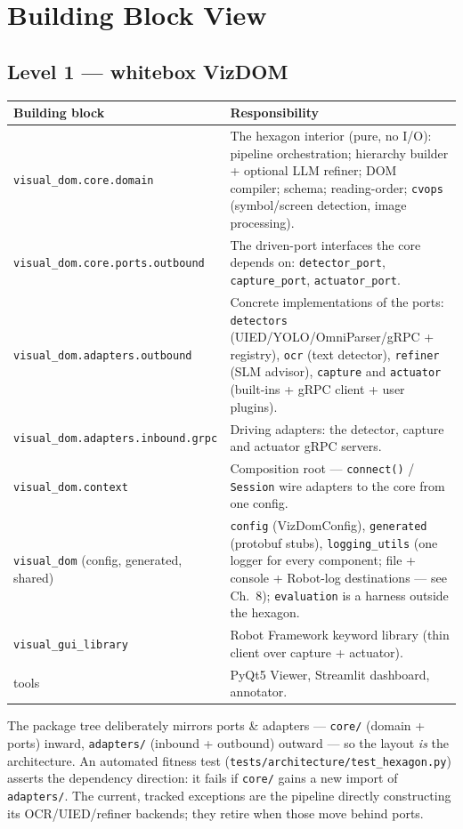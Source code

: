 \documentclass[11pt,a4paper]{report}
\newcommand{\code}[1]{\texttt{#1}}
\begin{document}
\chapter{Building Block View}
\section{Level 1 --- whitebox VizDOM}
\begin{longtable}{@{}p{3.8cm}p{10.8cm}@{}}
\toprule
\textbf{Building block} & \textbf{Responsibility} \\
\midrule
\endhead
\code{visual\_dom.core.domain} & The hexagon interior (pure, no I/O): pipeline orchestration; hierarchy builder + optional LLM refiner; DOM compiler; schema; reading-order; \code{cvops} (symbol/screen detection, image processing). \\
\code{visual\_dom.core.ports.\allowbreak outbound} & The driven-port interfaces the core depends on: \code{detector\_port}, \code{capture\_port}, \code{actuator\_port}. \\
\code{visual\_dom.adapters.\allowbreak outbound} & Concrete implementations of the ports: \code{detectors} (UIED/YOLO/OmniParser/gRPC + registry), \code{ocr} (text detector), \code{refiner} (SLM advisor), \code{capture} and \code{actuator} (built-ins + gRPC client + user plugins). \\
\code{visual\_dom.adapters.\allowbreak inbound.grpc} & Driving adapters: the detector, capture and actuator gRPC servers. \\
\code{visual\_dom.context} & Composition root --- \code{connect()} / \code{Session} wire adapters to the core from one config. \\
\code{visual\_dom} (config, generated, shared) & \code{config} (VizDomConfig), \code{generated} (protobuf stubs), \code{logging\_utils} (one logger for every component; file + console + Robot-log destinations --- see Ch.~8); \code{evaluation} is a harness outside the hexagon. \\
\code{visual\_gui\_library} & Robot Framework keyword library (thin client over capture + actuator). \\
tools & PyQt5 Viewer, Streamlit dashboard, annotator. \\
\bottomrule
\end{longtable}

\noindent The package tree deliberately mirrors ports \& adapters --- \code{core/}
(domain + ports) inward, \code{adapters/} (inbound + outbound) outward --- so the
layout \emph{is} the architecture. An automated fitness test
(\code{tests/architecture/test\_hexagon.py}) asserts the dependency direction: it
fails if \code{core/} gains a new import of \code{adapters/}. The current, tracked
exceptions are the pipeline directly constructing its OCR/UIED/refiner backends;
they retire when those move behind ports.
\end{document}
